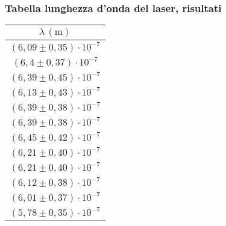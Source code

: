 \subsubsection{Tabella lunghezza d'onda del laser, risultati}
    \begin{table}[H]
    \centering
        \begin{tabular}{|c|}
        \hline
        $ \lambda \, (\text{m}) $ \\
        \hline
        $(6,09 \pm 0,35) \cdot 10^{-7}$ \\
        \hline
        $(6,4 \pm 0,37) \cdot 10^{-7}$ \\
        \hline
        $(6,39 \pm 0,45) \cdot 10^{-7}$ \\
        \hline
        $(6,13 \pm 0,43) \cdot 10^{-7}$ \\
        \hline
        $(6,39 \pm 0,38) \cdot 10^{-7}$ \\
        \hline
        $(6,39 \pm 0,38) \cdot 10^{-7}$ \\
        \hline
        $(6,45 \pm 0,42) \cdot 10^{-7}$ \\
        \hline
        $(6,21 \pm 0,40) \cdot 10^{-7}$ \\
        \hline
        $(6,21 \pm 0,40) \cdot 10^{-7}$ \\
        \hline
        $(6,12 \pm 0,38) \cdot 10^{-7}$ \\
        \hline
        $(6,01 \pm 0,37) \cdot 10^{-7}$ \\
        \hline
        $(5,78 \pm 0,35) \cdot 10^{-7}$ \\
        \hline
        \end{tabular}
    \end{table}


